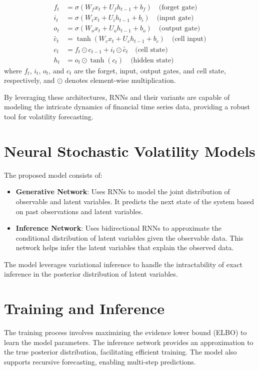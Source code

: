 \documentclass[letterpaper, 11pt]{article}
\begin{document}
\begin{align}
f_t &= \sigma(W_f x_t + U_f h_{t-1} + b_f) \quad \text{(forget gate)} \\
i_t &= \sigma(W_i x_t + U_i h_{t-1} + b_i) \quad \text{(input gate)} \\
o_t &= \sigma(W_o x_t + U_o h_{t-1} + b_o) \quad \text{(output gate)} \\
\tilde{c_t} &= \tanh(W_c x_t + U_c h_{t-1} + b_c) \quad \text{(cell input)} \\
c_t &= f_t \odot c_{t-1} + i_t \odot \tilde{c_t} \quad \text{(cell state)} \\
h_t &= o_t \odot \tanh(c_t) \quad \text{(hidden state)}
\end{align}
where \( f_t \), \( i_t \), \( o_t \), and \( c_t \) are the forget, input, output gates, and cell state, respectively, and \( \odot \) denotes element-wise multiplication.

By leveraging these architectures, RNNs and their variants are capable of modeling the intricate dynamics of financial time series data, providing a robust tool for volatility forecasting.


\section{Neural Stochastic Volatility Models}
The proposed model consists of:
\begin{itemize}
    \item \textbf{Generative Network}: Uses RNNs to model the joint distribution of observable and latent variables. It predicts the next state of the system based on past observations and latent variables.
    \item \textbf{Inference Network}: Uses bidirectional RNNs to approximate the conditional distribution of latent variables given the observable data. This network helps infer the latent variables that explain the observed data.
\end{itemize}
The model leverages variational inference to handle the intractability of exact inference in the posterior distribution of latent variables.

\section{Training and Inference}
The training process involves maximizing the evidence lower bound (ELBO) to learn the model parameters. The inference network provides an approximation to the true posterior distribution, facilitating efficient training. The model also supports recursive forecasting, enabling multi-step predictions.
\end{document}
